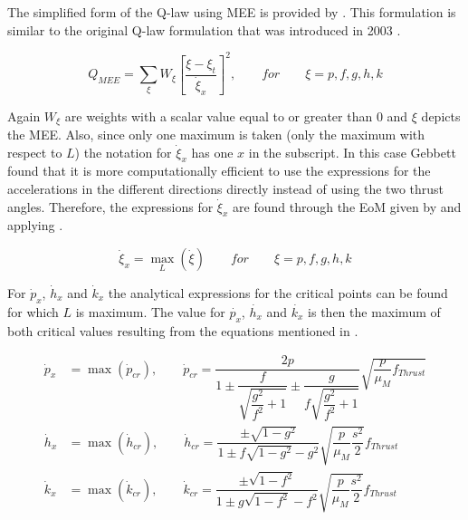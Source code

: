 The simplified form of the Q-law using \ac{MEE} is provided by \cite{gebbett2014multi}. This formulation is similar to the original Q-law formulation that was introduced in 2003 \cite{petropoulos2003simple}.


\begin{equation} \label{eq:Qmee}
Q_{MEE}=\displaystyle\sum_{\xi}W_{\xi}\left[\dfrac{\xi-\xi_{t}}{\dot{\xi}_{x}}\right]^{2},\qquad  for \qquad \xi=p,f,g,h,k
\end{equation}



Again $W_{\xi}$ are  weights with a scalar value equal to or greater than 0 and $\xi$ depicts the \ac{MEE}. Also, since only one maximum is taken (only the maximum with respect to $L$) the notation for $\dot{\xi}_{x}$ has one $x$ in the subscript. In this case Gebbett found that it is more computationally efficient to use the expressions for the accelerations in the different directions directly instead of using the two thrust angles. Therefore, the expressions for $\dot{\xi}_{x}$ are found through the \ac{EoM} given by  and applying .

\begin{equation} \label{eq:max_L}
\dot{\xi}_{x}=\displaystyle\max_{L}\left(\dot{\xi}\right) \qquad for \qquad \xi=p,f,g,h,k 
\end{equation}

For $\dot{p}_{x}$, $\dot{h}_{x}$ and $\dot{k}_{x}$ the analytical expressions for the critical points can be found for which $L$ is maximum. The value for $\dot{p_{x}}$, $\dot{h_{x}}$ and $\dot{k_{x}}$ is then the maximum of both critical values resulting from the equations mentioned in  \cite{gebbett2014multi}.

\begin{equation} \label{eq:crit_phk}
\begin{split}
\dot{p}_{x}&=\max\left(\dot{p}_{cr}\right), \qquad \dot{p}_{cr}=\dfrac{2p}{1\pm \dfrac{f}{\sqrt{\dfrac{g^{2}}{f^{2}}+1}}\pm\dfrac{g}{f\sqrt{\dfrac{g^{2}}{f^{2}}+1}}}\sqrt{\dfrac{p}{\mu_{M}}f_{Thrust}}\\
\dot{h}_{x}&=\max\left(\dot{h}_{cr}\right), \qquad \dot{h}_{cr}=\dfrac{\pm \sqrt{1-g^{2}}}{1\pm f\sqrt{1-g^{2}}-g^{2}}\sqrt{\dfrac{p}{\mu_{M}}\dfrac{s^{2}}{2}}f_{Thrust}\\
\dot{k}_{x}&=\max\left(\dot{k}_{cr}\right), \qquad \dot{k}_{cr}=\dfrac{\pm \sqrt{1-f^{2}}}{1\pm g\sqrt{1-f^{2}}-f^{2}}\sqrt{\dfrac{p}{\mu_{M}}\dfrac{s^{2}}{2}}f_{Thrust}\\
\end{split}
\end{equation}

